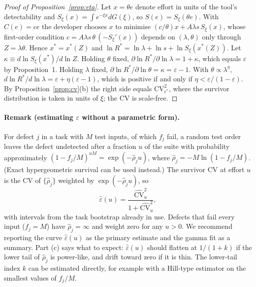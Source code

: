 \begin{proof}[Proof of Proposition~\ref{prop:eta}]
Let $x=\theta e$ denote effort in units of the tool's detectability and
$S_\xi(x)=\int e^{-\xi x}dG(\xi)$, so $S(e)=S_\xi(\theta e)$. With $C(e)=ce$ the
developer chooses $x$ to minimise $(c/\theta)x+A\lambda s\,S_\xi(x)$, whose
first-order condition $c=A\lambda s\,\theta\,(-S_\xi'(x))$ depends on $(\lambda,\theta)$
only through $Z=\lambda\theta$. Hence $x^*=x^*(Z)$ and
$\ln R^*=\ln\lambda+\ln s+\ln S_\xi(x^*(Z))$. Let
$\kappa\equiv d\ln S_\xi(x^*)/d\ln Z$. Holding $\theta$ fixed,
$\partial\ln R^*/\partial\ln\lambda=1+\kappa$, which equals $\varepsilon$ by
Proposition~1. Holding $\lambda$ fixed,
$\partial\ln R^*/\partial\ln\theta=\kappa=\varepsilon-1$. With
$\theta\propto\lambda^\eta$, $d\ln R^*/d\ln\lambda=\varepsilon+\eta(\varepsilon-1)$,
which is positive if and only if $\eta<\varepsilon/(1-\varepsilon)$. By
Proposition~\ref{prop:cv}(b) the right side equals $\mathrm{CV}_{e^*}^2$, where the survivor
distribution is taken in units of $\xi$; the CV is scale-free.
\end{proof}


\paragraph{Remark (estimating $\varepsilon$ without a parametric form).}
For defect $j$ in a task with $M$ test inputs, of which $f_j$ fail, a random test
order leaves the defect undetected after a fraction $u$ of the suite with probability
approximately $(1-f_j/M)^{uM}=\exp(-\hat\rho_j u)$, where
$\hat\rho_j=-M\ln(1-f_j/M)$. (Exact hypergeometric survival can be used instead.)
The survivor CV at effort $u$ is the CV of $\{\hat\rho_j\}$ weighted by
$\exp(-\hat\rho_j u)$, so
\[
  \hat\varepsilon(u)=\frac{\widehat{\mathrm{CV}}_u^2}{1+\widehat{\mathrm{CV}}_u^2},
\]
with intervals from the task bootstrap already in use. Defects that fail every input
($f_j=M$) have $\hat\rho_j=\infty$ and weight zero for any $u>0$. We recommend reporting
the curve $\hat\varepsilon(u)$ as the primary estimate and the gamma fit as a summary.
Part (c) says what to expect: $\hat\varepsilon(u)$ should flatten at $1/(1+k)$ if the
lower tail of $\hat\rho_j$ is power-like, and drift toward zero if it is thin. The
lower-tail index $k$ can be estimated directly, for example with a Hill-type estimator on
the smallest values of $f_j/M$.

